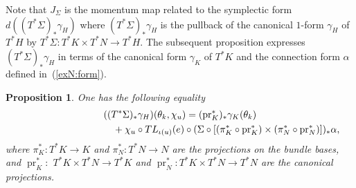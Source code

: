 \documentclass[pdftex]{sigma}
\renewcommand{\to}{\rightarrow}
\numberwithin{equation}{section}
\newtheorem{Proposition}[Theorem]{Proposition}
 { \theoremstyle{definition}
\newtheorem{Definition}[Theorem]{Definition}
\newtheorem{Example}[Theorem]{Example}
\newtheorem{Remark}[Theorem]{Remark} }
\begin{document}
 Note that $J_\Sigma$ is the momentum map related to the symplectic form $d((T^*\Sigma)_*\gamma_H)$ where $(T^*\Sigma)_*\gamma_H$ is the pullback of the canonical $1$-form $\gamma_H$ of $T^*H$ by $T^*\Sigma\colon T^*K\times T^*N\to T^*H$. The subsequent proposition expresses $(T^*\Sigma)_*\gamma_H$ in terms of the canonical form $\gamma_K$ of $T^*K$ and the connection form $\alpha$ def\/ined in~(\ref{exN:form}).
 \begin{Proposition} One has the following equality
 \begin{gather} ((T^*\Sigma)_*\gamma_H)(\theta_k,\chi_u)=(\operatorname{pr}_K^*)_*\gamma_K(\theta_k)\nonumber\\
 \hphantom{((T^*\Sigma)_*\gamma_H)(\theta_k,\chi_u)=}{} +\chi_u\circ TL_{\iota(u)}(e)\circ(\Sigma\circ[(\pi_K^*\circ \operatorname{pr}_K^*)\times (\pi_N^*\circ \operatorname{pr}_N^*)])_*\alpha, \label{exN:pulback}\end{gather}
 where $\pi^*_K\colon T^*K\to K$ and $\pi^*_N\colon T^*N\to N$ are the projections on the bundle bases, and $\operatorname{pr}_K^*\colon$ $T^*K\times T^*N\to T^*K$ and $\operatorname{pr}_N^*\colon T^*K\times T^*N\to T^*N$ are the canonical projections.
 \end{Proposition}
\end{document}
